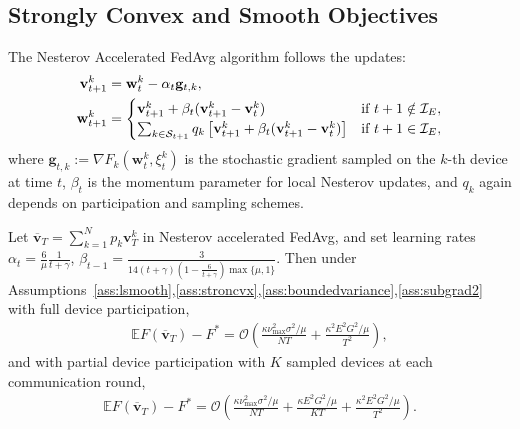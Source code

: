 \subsection{Strongly Convex and Smooth Objectives}
\begin{comment}
We first show that the Nesterov accelerated FedAvg has $\mathcal{O}(1/NT)$
convergence rate for $\mu$-strongly convex and $L$-smooth objectives.
\end{comment}
The Nesterov Accelerated FedAvg algorithm follows the updates:
\begin{align*}
\mathbf{v}_{t+1}^{k} & =\mathbf{w}_{t}^{k}-\alpha_{t}\mathbf{g}_{t,k}, \\
\mathbf{w}_{t+1}^{k} &=\begin{cases}
\mathbf{v}_{t+1}^{k}+\beta_{t}(\mathbf{v}_{t+1}^{k}-\mathbf{v}_{t}^{k}) & \text{if }t+1\notin\mathcal{I}_{E},\\
\sum_{k \in {\mathcal{S}}_{t+1}}q_k\left[\mathbf{v}_{t+1}^{k}+\beta_{t}(\mathbf{v}_{t+1}^{k}-\mathbf{v}_{t}^{k})\right] & \text{if }t+1\in\mathcal{I}_{E},
\end{cases}
\end{align*}
where $\mathbf{g}_{t,k}:=\nabla F_{k}(\mathbf{w}_{t}^{k},\xi_{t}^{k})$ is
the stochastic gradient sampled on the $k$-th device at time $t$, $\beta_t$ is the momentum parameter for local Nesterov updates, and $q_k$ again depends on participation and sampling schemes.  
\begin{theorem}
	\label{thm:nesterov_scvx}Let $\overline{\mathbf{v}}_{T}=\sum_{k=1}^{N}p_{k}\mathbf{v}_{T}^{k}$ in Nesterov accelerated FedAvg,
	and set learning rates $\alpha_{t}=\frac{6}{\mu}\frac{1}{t+\gamma}$,  $\beta_{t-1}=\frac{3}{14(t+\gamma)(1-\frac{6}{t+\gamma})\max\{\mu,1\}}$. Then under Assumptions~\ref{ass:lsmooth},\ref{ass:stroncvx},\ref{ass:boundedvariance},\ref{ass:subgrad2} with full device participation, 
	\small{\begin{align*}
	\mathbb{E}F(\overline{\mathbf{v}}_{T})-F^{\ast}=\mathcal{O}\left(\frac{\kappa\nu_{\max}^{2}\sigma^{2}/\mu}{NT}+\frac{\kappa^{2}E^{2}G^{2}/\mu}{T^{2}}\right),
	\end{align*}}
	and with partial device participation with $K$ sampled devices at
	each communication round, 
	\small{
	\begin{align*}
	\mathbb{E}F(\overline{\mathbf{v}}_{T})-F^{\ast}=\mathcal{O}\left(\frac{\kappa\nu_{\max}^{2}\sigma^{2}/\mu}{NT}+\frac{\kappa E^{2}G^{2}/\mu}{KT}+\frac{\kappa^{2}E^{2}G^{2}/\mu}{T^{2}}\right).
	\end{align*}}
\end{theorem}

